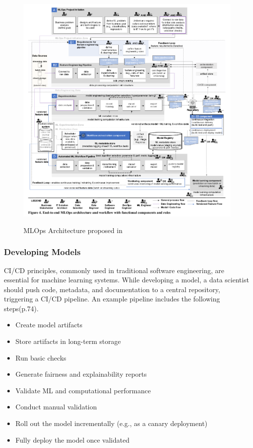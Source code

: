 \begin{figure}[!htbp]
    \caption{MLOps Architecture proposed in \cite{Kreuzberger2022MachineLO}}
    \centering
    \includegraphics[scale=0.5]{images/kreuz-end-to-end-workflow}
    \label{fig:end-to-end-workflow}
\end{figure}

\subsubsection{Developing Models}
CI/CD principles, commonly used in traditional software engineering, are essential for machine learning systems.
While developing a model, a data scientist should push code, metadata, and documentation to a central repository, triggering a CI/CD pipeline.
An example pipeline includes the following steps\cite{treveil2020introducing}(p.74).

\begin{itemize}
    \item Create model artifacts
    \item Store artifacts in long-term storage
    \item Run basic checks
    \item Generate fairness and explainability reports
\end{itemize}
\begin{itemize}
    \item Validate ML and computational performance
    \item Conduct manual validation
\end{itemize}
\begin{itemize}
    \item Roll out the model incrementally (e.g., as a canary deployment)
    \item Fully deploy the model once validated
\end{itemize}


